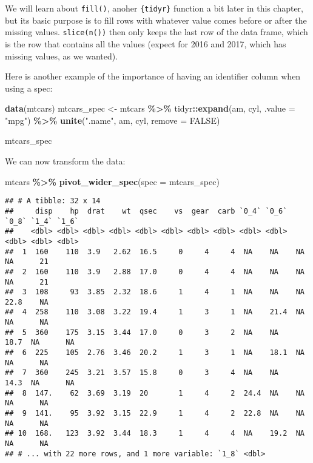 \documentclass[
]{article}
\newenvironment{Shaded}{\begin{snugshade}}{\end{snugshade}}
\newcommand{\DataTypeTok}[1]{\textcolor[rgb]{0.13,0.29,0.53}{#1}}
\newcommand{\KeywordTok}[1]{\textcolor[rgb]{0.13,0.29,0.53}{\textbf{#1}}}
\newcommand{\NormalTok}[1]{#1}
\newcommand{\OperatorTok}[1]{\textcolor[rgb]{0.81,0.36,0.00}{\textbf{#1}}}
\newcommand{\OtherTok}[1]{\textcolor[rgb]{0.56,0.35,0.01}{#1}}
\newcommand{\StringTok}[1]{\textcolor[rgb]{0.31,0.60,0.02}{#1}}
\begin{document}
We will learn about \texttt{fill()}, anoher \texttt{\{tidyr\}} function a bit later in this chapter, but its basic
purpose is to fill rows with whatever value comes before or after the missing values. \texttt{slice(n())}
then only keeps the last row of the data frame, which is the row that contains all the values (expect
for 2016 and 2017, which has missing values, as we wanted).

Here is another example of the importance of having an identifier column when using a spec:

\begin{Shaded}
\begin{Highlighting}[]
\KeywordTok{data}\NormalTok{(mtcars)}
\NormalTok{mtcars\_spec \textless{}{-}}\StringTok{ }\NormalTok{mtcars }\OperatorTok{\%\textgreater{}\%}\StringTok{ }
\StringTok{    }\NormalTok{tidyr}\OperatorTok{::}\KeywordTok{expand}\NormalTok{(am, cyl, }\DataTypeTok{.value =} \StringTok{"mpg"}\NormalTok{) }\OperatorTok{\%\textgreater{}\%}
\StringTok{    }\KeywordTok{unite}\NormalTok{(}\StringTok{".name"}\NormalTok{, am, cyl, }\DataTypeTok{remove =} \OtherTok{FALSE}\NormalTok{)}

\NormalTok{mtcars\_spec}
\end{Highlighting}
\end{Shaded}

We can now transform the data:

\begin{Shaded}
\begin{Highlighting}[]
\NormalTok{mtcars }\OperatorTok{\%\textgreater{}\%}\StringTok{ }
\StringTok{    }\KeywordTok{pivot\_wider\_spec}\NormalTok{(}\DataTypeTok{spec =}\NormalTok{ mtcars\_spec)}
\end{Highlighting}
\end{Shaded}

\begin{verbatim}
## # A tibble: 32 x 14
##     disp    hp  drat    wt  qsec    vs  gear  carb `0_4` `0_6` `0_8` `1_4` `1_6`
##    <dbl> <dbl> <dbl> <dbl> <dbl> <dbl> <dbl> <dbl> <dbl> <dbl> <dbl> <dbl> <dbl>
##  1  160    110  3.9   2.62  16.5     0     4     4  NA    NA    NA    NA      21
##  2  160    110  3.9   2.88  17.0     0     4     4  NA    NA    NA    NA      21
##  3  108     93  3.85  2.32  18.6     1     4     1  NA    NA    NA    22.8    NA
##  4  258    110  3.08  3.22  19.4     1     3     1  NA    21.4  NA    NA      NA
##  5  360    175  3.15  3.44  17.0     0     3     2  NA    NA    18.7  NA      NA
##  6  225    105  2.76  3.46  20.2     1     3     1  NA    18.1  NA    NA      NA
##  7  360    245  3.21  3.57  15.8     0     3     4  NA    NA    14.3  NA      NA
##  8  147.    62  3.69  3.19  20       1     4     2  24.4  NA    NA    NA      NA
##  9  141.    95  3.92  3.15  22.9     1     4     2  22.8  NA    NA    NA      NA
## 10  168.   123  3.92  3.44  18.3     1     4     4  NA    19.2  NA    NA      NA
## # ... with 22 more rows, and 1 more variable: `1_8` <dbl>
\end{verbatim}
\end{document}
